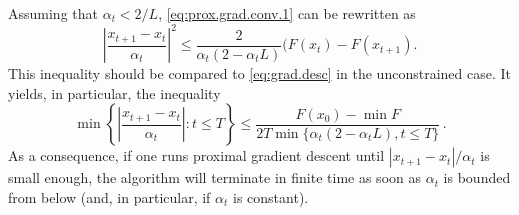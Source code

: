 %
Assuming that $\alpha_t < 2/L$, \cref{eq:prox.grad.conv.1} can be rewritten as
\[
 \left |\frac{x_{t+1}-x_t}{\alpha_t}\right|^2 \leq \frac2{\alpha_t(2-\alpha_t L)} (F(x_{t}) - F(x_{t+1}).
\]
This inequality should be compared to \cref{eq:grad.desc} in the unconstrained case. It yields, in particular, the inequality
\begin{equation}
\label{eq:pg.convergence.1}
\min\left\{ \left |\frac{x_{t+1}-x_t}{\alpha_t}\right|: t\leq T\right\} \leq \frac{F(x_0) - \min F}{2T \min \{\alpha_t(2-\alpha_t L), t\leq T\}}\,.
\end{equation}
As a consequence, if one runs proximal gradient descent until $|x_{t+1}-x_t|/\alpha_t$ is small enough, the algorithm will terminate in finite time as soon as $\alpha_t$ is bounded from below (and, in particular, if $\alpha_t$ is constant).

%
%
%
%
%

